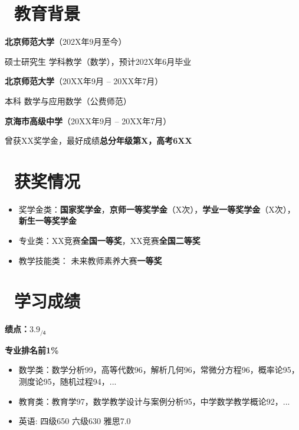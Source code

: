 \documentclass[11pt]{article}
\begin{document}

\section{\makebox[\widthof{\faGraduationCap}][c]{\color{CVBlue}\faGraduationCap}\  教育背景}

\textbf{北京师范大学}（202X年9月至今）

\qquad 硕士研究生 \quad 学科教学（数学），预计202X年6月毕业

\textbf{北京师范大学}（20XX年9月 -- 20XX年7月）

\qquad 本科 \quad 数学与应用数学（公费师范）

\textbf{京海市高级中学}（20XX年9月 -- 20XX年7月） %

\qquad 曾获XX奖学金，最好成绩\textbf{总分年级第X，高考6XX}

\section{\makebox[\widthof{\faGraduationCap}][c]{\color{CVBlue}\faTrophy}\ 获奖情况}
\begin{itemize}
	\item 奖学金类：\textbf{国家奖学金}，\textbf{京师一等奖学金}（X次），\textbf{学业一等奖学金}（X次），\textbf{新生一等奖学金}
	\item 专业类：XX竞赛\textbf{全国一等奖}，XX竞赛\textbf{全国二等奖}
	\item 教学技能类： 未来教师素养大赛\textbf{一等奖}
\end{itemize}


\section{\makebox[\widthof{\faGraduationCap}][c]{\color{CVBlue}\faFileText}\ 学习成绩}
\textbf{绩点：$\mathsf{3.9_{/4}}$} \

\textbf{专业排名前1\%}
\begin{itemize}[parsep=0.5ex]
	\item 数学类：数学分析99，高等代数96，解析几何96，常微分方程96，概率论95，测度论95，随机过程94，...
	\item 教育类：教育学97，数学教学设计与案例分析95，中学数学教学概论92，...
	\item 英语: 四级650 六级630 雅思7.0
\end{itemize}
\end{document}
